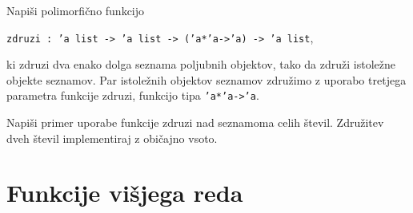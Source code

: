 \begin{ex}
Napi\v si polimorfi\v cno funkcijo 

\begin{center}
\texttt{zdruzi : 'a list -> 'a list -> ('a*'a->'a) -> 'a list}, 
\end{center}

ki zdruzi dva enako dolga seznama poljubnih objektov, tako da zdru\v zi istole\v zne objekte seznamov. Par istole\v znih objektov seznamov zdru\v zimo z uporabo tretjega parametra funkcije zdruzi, funkcijo tipa \texttt{'a*'a->'a}.

Napi\v si primer uporabe funkcije zdruzi nad seznamoma celih \v stevil. Zdru\v zitev dveh \v stevil implementiraj z obi\v cajno vsoto. 
\end{ex}


\section{Funkcije vi\v sjega reda}


